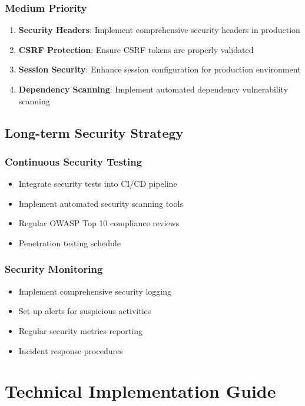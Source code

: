 \documentclass[12pt]{article}
\begin{document}
\subsubsection{Medium Priority}
\begin{enumerate}
    \item \textbf{Security Headers}: Implement comprehensive security headers in production
    \item \textbf{CSRF Protection}: Ensure CSRF tokens are properly validated
    \item \textbf{Session Security}: Enhance session configuration for production environment
    \item \textbf{Dependency Scanning}: Implement automated dependency vulnerability scanning
\end{enumerate}

\subsection{Long-term Security Strategy}

\subsubsection{Continuous Security Testing}
\begin{itemize}
    \item Integrate security tests into CI/CD pipeline
    \item Implement automated security scanning tools
    \item Regular OWASP Top 10 compliance reviews
    \item Penetration testing schedule
\end{itemize}

\subsubsection{Security Monitoring}
\begin{itemize}
    \item Implement comprehensive security logging
    \item Set up alerts for suspicious activities
    \item Regular security metrics reporting
    \item Incident response procedures
\end{itemize}

\section{Technical Implementation Guide}
\end{document}

